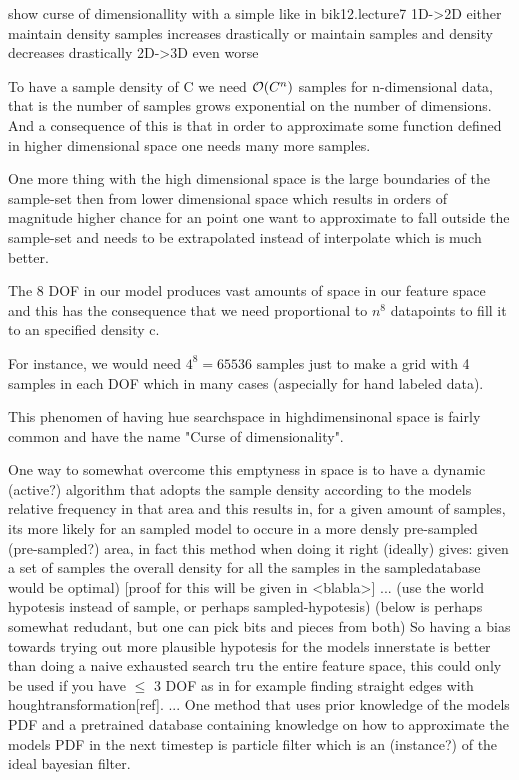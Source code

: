 show curse of dimensionallity with a simple like in bik12.lecture7
1D->2D
either maintain density samples increases drastically
or maintain samples and density decreases drastically
2D->3D
even worse

To have a sample density of C we need $\mathcal{O}{\left(C^n\right)}$ samples for n-dimensional data,
that is the number of samples grows exponential on the number of dimensions.
And a consequence of this is that in order to approximate some
function defined in higher dimensional space one needs many more samples.

One more thing with the high dimensional space is the large boundaries 
of the sample-set then from lower dimensional space which results in orders of
magnitude higher chance for an point one want to approximate to fall outside
the sample-set and needs to be extrapolated instead of interpolate which is
much better.

%
%

%
%

%
%




The 8 DOF in our model produces vast amounts of space in our feature space and this has the consequence that we need proportional to $n^8$ datapoints to fill it to an specified density c.

For instance, we would need $4^8=65536$ samples just to make a grid with 4 samples in each DOF which in many cases (aspecially for hand labeled data). 

This phenomen of having hue searchspace in highdimensinonal space is fairly common and have the name "Curse of dimensionality".

One way to somewhat overcome this emptyness in space is to have a dynamic (active?) algorithm that adopts the sample density 
according to the models relative frequency in that area and this results in, for a given amount of samples, its more likely 
for an sampled model to occure in a more densly pre-sampled (pre-sampled?) area, in fact this method when doing it right (ideally) 
gives: given a set of samples the overall density for all the samples in the sampledatabase would be optimal) [proof for this will be given in <blabla>]
... (use the world hypotesis instead of sample, or perhaps sampled-hypotesis)
(below is perhaps somewhat redudant, but one can pick bits and pieces from both)
So having a bias towards trying out more plausible hypotesis for the models innerstate is better than 
doing a naive exhausted search tru the entire feature space, this could only be used if you have $\le$ 3 DOF as in for example finding straight edges with houghtransformation[ref].
...
One method that uses prior knowledge of the models PDF and a pretrained database containing knowledge on how to approximate the models PDF in the next timestep is particle filter which is an (instance?) of the ideal bayesian filter.



